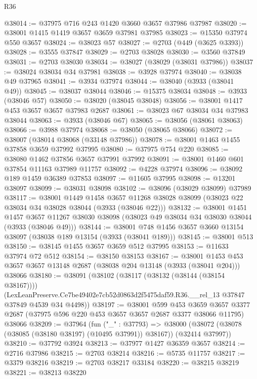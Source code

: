 \begin{lexlean}{R36}
\begin{coremodule}
@38014 := @37975 @716 @243 @1420 @3660 @3657 @37986 @37987
@38020 := @38001 @1415 @1419 @3657 @3659 @37981 @37985
@38023 := @15350 @37974 @550 @3657
@38024 := @38023 @57
@38027 := @2703 (@449 (@3625 @3393))
@38028 := @3555 @37847
@38029 := @2703 @38028
@38030 := @3560 @37849
@38031 := @2703 @38030
@38034 := @38027 (@38029 (@38031 @37986))
@38037 := @38024 @38034 @34 @37981
@38038 := @3928 @37974
@38040 := @38038 @49 @37965
@38041 := @3934 @37974
@38044 := @38040 (@3933 (@38041 @49))
@38045 := @38037 @38044
@38046 := @15375 @38034
@38048 := @3933 (@38046 @57)
@38050 := @38020 (@38045 @38048)
@38056 := @38001 @1417 @453 @3657 @3657 @37983 @2687
@38061 := @38023 @67 @38034 @34 @37983 @38044
@38063 := @3933 (@38046 @67)
@38065 := @38056 (@38061 @38063)
@38066 := @3988 @37974
@38068 := @38050 (@38065 @38066)
@38072 := @38007 (@38014 @38068 (@33148 @37986))
@38078 := @38001 @1463 @1455 @37858 @3659 @37992 @37995
@38080 := @37975 @754 @220
@38085 := @38080 @1462 @37856 @3657 @37991 @37992
@38091 := @38001 @1460 @601 @37854 @11163 @37989 @11757
@38092 := @4228 @37974
@38096 := @38092 @189 @1459 @36389 @37853
@38097 := @11605 @37995
@38098 := @13201 @38097
@38099 := @38031 @38098
@38102 := @38096 (@38029 @38099) @37989
@38117 := @38001
    @1449
    @1458
    @3657
    @11268
    @38028
    @38099
    (@38023 @22 @38034 @34 @38028 @38044 (@3933 (@38046 @22)))
@38132 := @38001
    @1451
    @1457
    @3657
    @11267
    @38030
    @38098
    (@38023 @49 @38034 @34 @38030 @38044 (@3933 (@38046 @49)))
@38144 := @38001 @748 @1456 @3657 @3660 @13154 @38097 (@38038 @189 @13154 (@3933 (@38041 @189)))
@38145 := @38001 @513
@38150 := @38145 @1455 @3657 @3659 @512 @37995
@38153 := @11633 @37974 @72 @512
@38154 := @38150 @38153
@38167 := @38001
    @1453
    @453
    @3657
    @3657
    @13148
    @2687
    (@38038 @204 @13148 (@3933 (@38041 @204)))
    @38066
@38180 := @38091
    (@38102
      (@38117 (@38132 (@38144 (@38154 @38167))))
      (LexLeanPreserve.Ce7be49402e7cb52d0863d2f5475daf59.R36.__rel_13
        @37847
        @37849
        @4539
        @34
        @4498))
@38197 := @38001
    @599
    @453
    @3659
    @3657
    @3377
    @2687
    (@37975 @596 @220 @453 @3657 @3657 @2687 @3377 @38066 @11795)
    @38066
@38209 := @37964
    (fun ("_" : @37793) =>
    @38000 (@38072 (@38078 (@38085 (@38180 @38197) (@10495 @37991)) @38167)) (@32414 @37997))
@38210 := @37792 @3924
@38213 := @37977 @1427 @36359 @3657
@38214 := @2716 @37986
@38215 := @2703 @38214
@38216 := @5735 @11757
@38217 := @3379 @38216
@38219 := @2703 @38217 @33184
@38220 := @38215 @38219
@38221 := @38213 @38220

\end{coremodule}
\end{lexlean}
